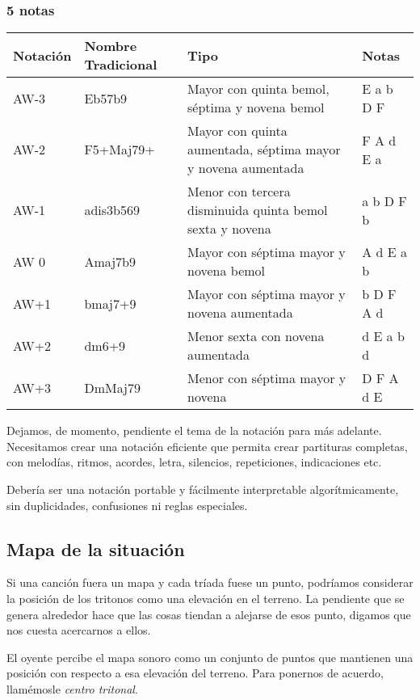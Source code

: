 \documentclass[]{article}
\begin{document}
\subsubsection*{5 notas}
\begin{table}[H]
  \centering
  \begin{tabularx}{\textwidth}{ll>{\raggedright\arraybackslash}Xl}
\toprule
Notación & Nombre Tradicional & Tipo & Notas \\
\midrule
\textsf{AW-3} & Eb57b9    & Mayor con quinta bemol, séptima y novena bemol & E a b D F\\
\textsf{AW-2} & F5+Maj79+ & Mayor con quinta aumentada, séptima mayor y novena aumentada & F A d E a\\
\textsf{AW-1} & adis3b569 & Menor con tercera disminuida quinta bemol sexta y novena & a b D F b\\
\textsf{AW 0} & Amaj7b9   & Mayor con séptima mayor y novena bemol & A d E a b\\
\textsf{AW+1} & bmaj7+9   & Mayor con séptima mayor y novena aumentada & b D F A d\\
\textsf{AW+2} & dm6+9     & Menor sexta con novena aumentada & d E a b d\\
\textsf{AW+3} & DmMaj79   & Menor con séptima mayor y novena & D F A d E\\ 
\bottomrule
\end{tabularx}
\end{table}

Dejamos, de momento, pendiente el tema de la notación para más adelante.  Necesitamos crear una notación eficiente que permita crear partituras completas, con melodías, ritmos, acordes, letra, silencios, repeticiones, indicaciones etc.

Debería ser una notación portable y fácilmente interpretable algorítmicamente, sin duplicidades, confusiones ni reglas especiales. 

\subsection{Mapa de la situación}

Si una canción fuera un mapa y cada tríada fuese un punto, podríamos considerar la posición de los tritonos como una elevación en el terreno. La pendiente que se genera alrededor hace que las cosas tiendan a alejarse de esos punto, digamos que nos cuesta acercarnos a ellos.

El oyente percibe el mapa sonoro como un conjunto de puntos que mantienen una posición con respecto a esa elevación del terreno. Para ponernos de acuerdo, llamémosle \emph{centro tritonal}.
\end{document}
